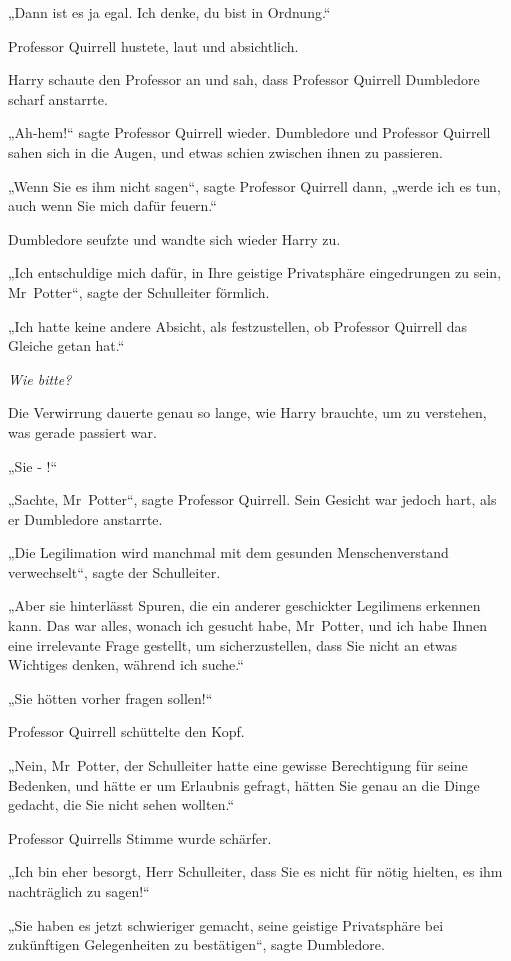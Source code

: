 {„Dann ist es ja egal. Ich denke, du bist in Ordnung.“

Professor Quirrell hustete, laut und absichtlich.

Harry schaute den Professor an und sah, dass Professor Quirrell Dumbledore scharf anstarrte.

„Ah-hem!“ sagte Professor Quirrell wieder. Dumbledore und Professor Quirrell sahen sich in die Augen, und etwas schien zwischen ihnen zu passieren.

„Wenn Sie es ihm nicht sagen“, sagte Professor Quirrell dann, „werde ich es tun, auch wenn Sie mich dafür feuern.“

Dumbledore seufzte und wandte sich wieder Harry zu.

„Ich entschuldige mich dafür, in Ihre geistige Privatsphäre eingedrungen zu sein, Mr~Potter“, sagte der Schulleiter förmlich.

„Ich hatte keine andere Absicht, als festzustellen, ob Professor Quirrell das Gleiche getan hat.“

\emph{Wie bitte?}

Die Verwirrung dauerte genau so lange, wie Harry brauchte, um zu verstehen, was gerade passiert war.

„Sie - !“

„Sachte, Mr~Potter“, sagte Professor Quirrell. Sein Gesicht war jedoch hart, als er Dumbledore anstarrte.

„Die Legilimation wird manchmal mit dem gesunden Menschenverstand verwechselt“, sagte der Schulleiter.

„Aber sie hinterlässt Spuren, die ein anderer geschickter Legilimens erkennen kann. Das war alles, wonach ich gesucht habe, Mr~Potter, und ich habe Ihnen eine irrelevante Frage gestellt, um sicherzustellen, dass Sie nicht an etwas Wichtiges denken, während ich suche.“

„Sie hötten vorher fragen sollen!“

Professor Quirrell schüttelte den Kopf.

„Nein, Mr~Potter, der Schulleiter hatte eine gewisse Berechtigung für seine Bedenken, und hätte er um Erlaubnis gefragt, hätten Sie genau an die Dinge gedacht, die Sie nicht sehen wollten.“

Professor Quirrells Stimme wurde schärfer.

„Ich bin eher besorgt, Herr Schulleiter, dass Sie es nicht für nötig hielten, es ihm nachträglich zu sagen!“

„Sie haben es jetzt schwieriger gemacht, seine geistige Privatsphäre bei zukünftigen Gelegenheiten zu bestätigen“, sagte Dumbledore.

}
